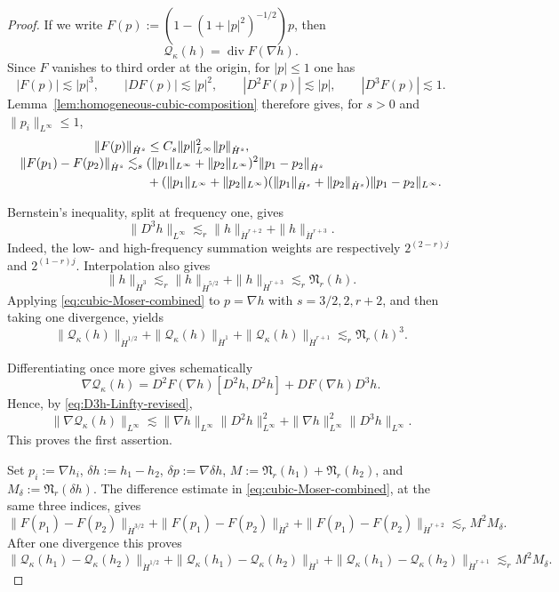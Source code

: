\documentclass[12pt]{amsart}
\theoremstyle{remark}
\theoremstyle{definition}
\numberwithin{equation}{section}
\begin{document}
\begin{proof}
If we write \(F(p):=(1-(1+|p|^2)^{-1/2})p\), then
\[
 \mathcal Q_\kappa(h)=\operatorname{div}F(\nabla h).
\]
Since \(F\) vanishes to third order at the origin, for \(|p|\leq1\) one has
\begin{equation*}
 |F(p)|\lesssim|p|^3, \qquad |DF(p)|\lesssim|p|^2, \qquad |D^2F(p)|\lesssim|p|, \qquad |D^3F(p)|\lesssim1.
\end{equation*}
Lemma~\ref{lem:homogeneous-cubic-composition} therefore gives, for
\(s>0\) and \(\|p_i\|_{L^\infty}\leq1\),
\begin{align}
\label{eq:cubic-Moser-combined}
 \|F(p)\|_{\dot H^s} &\leq C_s\|p\|_{L^\infty}^2\|p\|_{\dot H^s},
\notag\\[-1mm]
 \|F(p_1)-F(p_2)\|_{\dot H^s}
 \lesssim_s{}& (\|p_1\|_{L^\infty}+\|p_2\|_{L^\infty})^2
 \|p_1-p_2\|_{\dot H^s}\\
 &+(\|p_1\|_{L^\infty}+\|p_2\|_{L^\infty})
 (\|p_1\|_{\dot H^s}+\|p_2\|_{\dot H^s})
 \|p_1-p_2\|_{L^\infty}.
\notag
\end{align}

Bernstein's inequality, split at frequency one, gives
\begin{equation}
\label{eq:D3h-Linfty-revised}
 \|D^3h\|_{L^\infty} \lesssim_r \|h\|_{\dot H^{r+2}} + \|h\|_{\dot H^{r+3}}.
\end{equation}
Indeed, the low- and high-frequency summation weights are respectively
\(2^{(2-r)j}\) and \(2^{(1-r)j}\).
Interpolation also gives
\[
 \|h\|_{\dot H^3} \lesssim_r \|h\|_{\dot H^{5/2}} + \|h\|_{\dot H^{r+3}} \lesssim_r \mathfrak N_r(h).
\]
Applying \eqref{eq:cubic-Moser-combined} to \(p=\nabla h\) with
\(s=3/2,2,r+2\), and then taking one divergence, yields
\[
 \|\mathcal Q_\kappa(h)\|_{\dot H^{1/2}} + \|\mathcal Q_\kappa(h)\|_{\dot H^1} + \|\mathcal Q_\kappa(h)\|_{\dot H^{r+1}} \lesssim_r \mathfrak N_r(h)^3.
\]

Differentiating once more gives schematically
\[
 \nabla\mathcal Q_\kappa(h) = D^2F(\nabla h)[D^2h,D^2h] + DF(\nabla h)D^3h.
\]
Hence, by \eqref{eq:D3h-Linfty-revised},
\[
 \|\nabla\mathcal Q_\kappa(h)\|_{L^\infty} \lesssim \|\nabla h\|_{L^\infty} \|D^2h\|_{L^\infty}^2+ \|\nabla h\|_{L^\infty}^2 \|D^3h\|_{L^\infty}.
\]
This proves the first assertion.

Set \(p_i:=\nabla h_i\), \(\delta h:=h_1-h_2\), \(\delta p:=\nabla\delta h\), \(M:=\mathfrak N_r(h_1)+\mathfrak N_r(h_2)\), and \(M_\delta:=\mathfrak N_r(\delta h)\).
The difference estimate in \eqref{eq:cubic-Moser-combined}, at the same
three indices, gives
\[
 \|F(p_1)-F(p_2)\|_{\dot H^{3/2}} + \|F(p_1)-F(p_2)\|_{\dot H^2}+ \|F(p_1)-F(p_2)\|_{\dot H^{r+2}} \lesssim_r M^2M_\delta.
\]
After one divergence this proves
\[
 \|\mathcal Q_\kappa(h_1)-\mathcal Q_\kappa(h_2)\|_{\dot H^{1/2}} + \|\mathcal Q_\kappa(h_1)-\mathcal Q_\kappa(h_2)\|_{\dot H^1}+ \|\mathcal Q_\kappa(h_1)-\mathcal Q_\kappa(h_2)\|_{\dot H^{r+1}} \lesssim_r M^2M_\delta.
\]


\end{proof}
\end{document}
